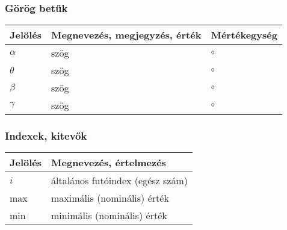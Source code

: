 \subsubsection*{Görög betűk}
\begin{center}
    \begin{tabular}{lp{10cm}l}
        \hline
        Jelölés & Megnevezés, megjegyzés, érték & Mértékegység \\ 
        \hline
        $\alpha$   & szög                   & $\circ$        \\
        $\theta$   & szög                   & $\circ$        \\
        $\beta$    & szög                   & $\circ$        \\
        $\gamma$   & szög                   & $\circ$        \\
        \hline
    \end{tabular}
\end{center}



\subsubsection*{Indexek, kitevők}
\begin{center}
    \begin{tabular}{lp{12.8cm}}
        \hline
        Jelölés & Megnevezés, értelmezés\\ 
        \hline
        $i$     & általános futóindex (egész szám)   \\
        max     & maximális (nominális) érték        \\
        min     & minimális (nominális) érték        \\        
        \hline
    \end{tabular}    
\end{center}


\def\arraystretch{1}%
